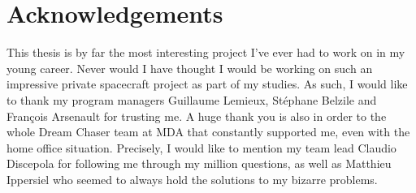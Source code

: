 \chapter*{Acknowledgements}\label{cha:ack}
This thesis is by far the most interesting project I've ever had to work on in my young career. Never would I have thought I would be working on such an impressive private spacecraft project as part of my studies. As such, I would like to thank my program managers Guillaume Lemieux, Stéphane Belzile and François Arsenault for trusting me. A huge thank you is also in order to the whole Dream Chaser team at MDA that constantly supported me, even with the home office situation. Precisely, I would like to mention my team lead Claudio Discepola for following me through my million questions, as well as Matthieu Ippersiel who seemed to always hold the solutions to my bizarre problems.